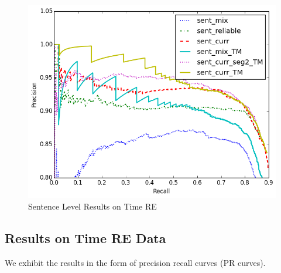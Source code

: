 \documentclass[11pt,a4paper]{article}
\begin{document}
\begin{figure}[htbp]
\begin{center}
\includegraphics[width=0.9\linewidth]{sent_time_exp_overall.png}
\caption{Sentence Level Results on Time RE}
\label{fig: sent_luo}
\end{center}
\end{figure}

\subsection{Results on Time RE Data}
We exhibit the results in the form of precision recall curves (PR curves). 
\end{document}

